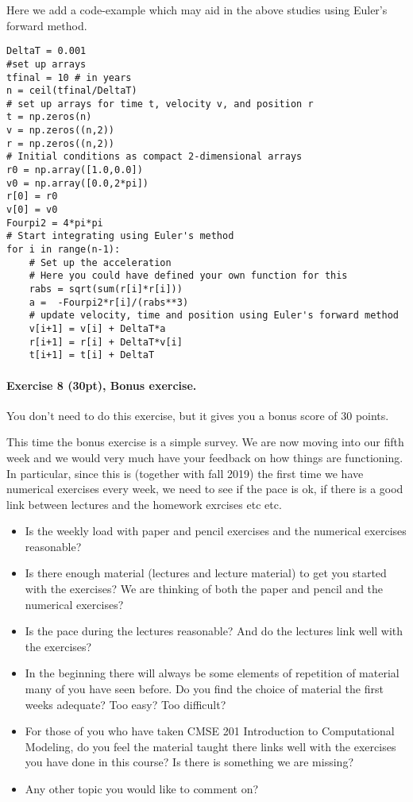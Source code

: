 \documentclass[%
oneside,                 %
final,                   %
10pt]{article}
\begin{document}
\noindent
Here we add a code-example which may aid in the above studies using Euler's forward method.
\begin{verbatim}
DeltaT = 0.001
#set up arrays 
tfinal = 10 # in years
n = ceil(tfinal/DeltaT)
# set up arrays for time t, velocity v, and position r
t = np.zeros(n)
v = np.zeros((n,2))
r = np.zeros((n,2))
# Initial conditions as compact 2-dimensional arrays
r0 = np.array([1.0,0.0])
v0 = np.array([0.0,2*pi])
r[0] = r0
v[0] = v0
Fourpi2 = 4*pi*pi
# Start integrating using Euler's method
for i in range(n-1):
    # Set up the acceleration
    # Here you could have defined your own function for this
    rabs = sqrt(sum(r[i]*r[i]))
    a =  -Fourpi2*r[i]/(rabs**3)
    # update velocity, time and position using Euler's forward method
    v[i+1] = v[i] + DeltaT*a
    r[i+1] = r[i] + DeltaT*v[i]
    t[i+1] = t[i] + DeltaT
\end{verbatim}


\paragraph{Exercise 8 (30pt), Bonus exercise.}
You don't need to do this exercise, but it gives you a bonus score of 30 points.

This time the bonus exercise is a simple survey. We are now moving
into our fifth week and we would very much have your feedback on how
things are functioning. In particular, since this is (together with fall
2019) the first time we have numerical exercises every week, we need
to see if the pace is ok, if there is a good link between lectures and
the homework exrcises etc etc.

\begin{itemize}
\item Is the weekly load with paper and pencil exercises and the numerical exercises reasonable?

\item Is there enough material (lectures and lecture material) to get you started with the exercises?  We are thinking of both the paper and pencil and the numerical exercises?

\item Is the pace during the lectures reasonable? And do the lectures link well with the exercises?

\item In the beginning there will always be some elements of repetition of material many of you have seen before. Do you find the choice of material the first weeks adequate? Too easy? Too difficult?

\item For those of you who have taken CMSE 201 Introduction to Computational Modeling, do you feel the material taught there links well with the exercises you have done in this course? Is there is something we are missing?

\item Any other topic you would like to comment on?
\end{itemize}

\noindent

\end{document}
